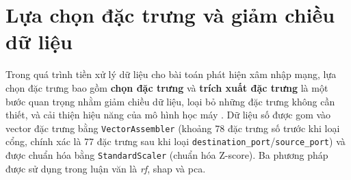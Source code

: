 \section{Lựa chọn đặc trưng và giảm chiều dữ liệu}

Trong quá trình tiền xử lý dữ liệu cho bài toán phát hiện xâm nhập mạng, lựa chọn đặc trưng bao gồm \textbf{chọn đặc trưng} và \textbf{trích xuất đặc trưng} là một bước quan trọng nhằm giảm chiều dữ liệu, loại bỏ những đặc trưng không cần thiết, và cải thiện hiệu năng của mô hình học máy \cite{guyon2003introduction}. Dữ liệu số được gom vào vector đặc trưng bằng \texttt{VectorAssembler} (khoảng 78 đặc trưng số trước khi loại cổng, chính xác là 77 đặc trưng sau khi loại \texttt{destination\_port}/\texttt{source\_port}) và được chuẩn hóa bằng \texttt{StandardScaler} (chuẩn hóa Z-score). Ba phương pháp được sử dụng trong luận văn là \textit{\ac{rf}}, \ac{shap} và \ac{pca}.

